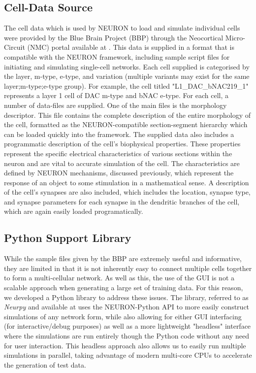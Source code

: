 \documentclass[letterpaper, 10 pt, conference]{ieeeconf}  %
\begin{document}
\subsection*{Cell-Data Source}
The cell data which is used by NEURON to load and simulate individual cells were provided by the Blue Brain Project (BBP) through the Neocortical Micro-Circuit (NMC) portal available at \cite{nmcPortal}. This data is supplied in a format that is compatible with the NEURON framework, including sample script files for initiating and simulating single-cell networks. Each cell supplied is categorised by the layer, m-type, e-type, and variation (multiple variants may exist for the same layer;m-type;e-type group). For example, the cell titled "L1\_DAC\_bNAC219\_1" represents a layer 1 cell of DAC m-type and bNAC e-type. For each cell, a number of data-files are supplied. One of the main files is the morphology descriptor. This file contains the complete description of the entire morphology of the cell, formatted as the NEURON-compatible section-segment hierarchy which can be loaded quickly into the framework. The supplied data also includes a programmatic description of the cell's biophysical properties. These properties represent the specific electrical characteristics of various sections within the neuron and are vital to accurate simulation of the cell. The characteristics are defined by NEURON mechanisms, discussed previously, which represent the response of an object to some stimulation in a mathematical sense. A description of the cell's synapses are also included, which includes the location, synapse type, and synapse parameters for each synapse in the dendritic branches of the cell, which are again easily loaded programatically.\\

\subsection*{Python Support Library}
While the sample files given by the BBP are extremely useful and informative, they are limited in that it is not inherently easy to connect multiple cells together to form a multi-cellular network. As well as this, the use of the GUI is not a scalable approach when generating a large set of training data. For this reason, we developed a Python library to address these issues. The library, referred to as \emph{Neurpy} and available at \cite{neurpyGit} uses the NEURON-Python API to more easily construct simulations of any network form, while also allowing for either GUI interfacing (for interactive/debug purposes) as well as a more lightweight "headless" interface where the simulations are run entirely though the Python code without any need for user interaction. This headless approach also allows us to easily run multiple simulations in parallel, taking advantage of modern multi-core CPUs to accelerate the generation of test data.\\
\end{document}
